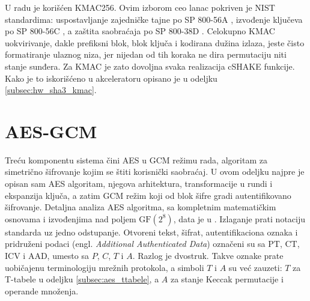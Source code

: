 \begin{table}[H]
\caption{Uloge parametara KMAC funkcije: autentifikacija poruka naspram izvođenja ključeva}
\centering
{}
\label{tab:kmac_uloge}
\end{table}

U radu je korišćen KMAC256. Ovim izborom ceo lanac pokriven je NIST standardima: uspostavljanje zajedničke tajne po SP 800-56A \cite{sp80056a}, izvođenje ključeva po SP 800-56C \cite{sp80056c}, a zaštita saobraćaja po SP 800-38D \cite{sp80038d}.
\smallbreak
Celokupno KMAC uokvirivanje, dakle prefiksni blok, blok ključa i kodirana dužina izlaza, jeste čisto formatiranje ulaznog niza, jer nijedan od tih koraka ne dira permutaciju niti stanje sunđera. Za KMAC je zato dovoljna svaka realizacija cSHAKE funkcije. Kako je to iskorišćeno u akceleratoru opisano je u odeljku \ref{subsec:hw_sha3_kmac}.

\section{AES-GCM}
\label{sec:aes_gcm}

Treću komponentu sistema čini AES u GCM režimu rada, algoritam za simetrično šifrovanje kojim se štiti korisnički saobraćaj. U ovom odeljku najpre je opisan sam AES algoritam, njegova arhitektura, transformacije u rundi i ekspanzija ključa, a zatim GCM režim koji od blok šifre gradi autentifikovano šifrovanje. Detaljna analiza AES algoritma, sa kompletnim matematičkim osnovama i izvođenjima nad poljem $\mathrm{GF}(2^8)$, data je u \cite{gavrilovic_diplomski}.
\smallbreak
Izlaganje prati notaciju standarda \cite{fips197, sp80038d} uz jedno odstupanje. Otvoreni tekst, šifrat, autentifikaciona oznaka i pridruženi podaci (engl. \textit{Additional Authenticated Data}) označeni su sa $\mathrm{PT}$, $\mathrm{CT}$, $\mathrm{ICV}$ i $\mathrm{AAD}$, umesto sa $P$, $C$, $T$ i $A$. Razlog je dvostruk. Takve oznake prate uobičajenu terminologiju mrežnih protokola, a simboli $T$ i $A$ su već zauzeti: $T$ za T-tabele u odeljku \ref{subsec:aes_ttabele}, a $A$ za stanje Keccak permutacije i operande množenja.

